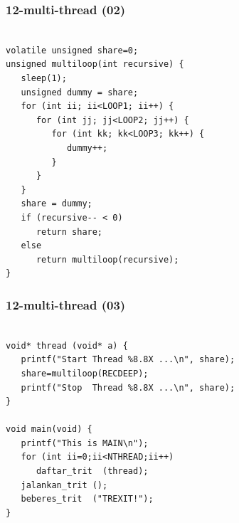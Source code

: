 \documentclass[xcolor=table, notheorems, hyperref={pdfpagelabels=false}]{beamer}
\begin{document}
\begin{frame}[fragile]
\frametitle{12-multi-thread (02)}
\begin{lstlisting}[basicstyle=\ttfamily\small]        %  65
% \begin{lstlisting}[basicstyle=\ttfamily\large]        %  54

volatile unsigned share=0;
unsigned multiloop(int recursive) {
   sleep(1);
   unsigned dummy = share;
   for (int ii; ii<LOOP1; ii++) {
      for (int jj; jj<LOOP2; jj++) {
         for (int kk; kk<LOOP3; kk++) {
            dummy++;
         }
      }
   }
   share = dummy;
   if (recursive-- < 0)
      return share;
   else
      return multiloop(recursive);
}

\end{lstlisting}
\end{frame}

\begin{frame}[fragile]
\frametitle{12-multi-thread (03)}
\begin{lstlisting}[basicstyle=\ttfamily\large]        %  54

void* thread (void* a) {
   printf("Start Thread %8.8X ...\n", share);
   share=multiloop(RECDEEP);
   printf("Stop  Thread %8.8X ...\n", share);
}

void main(void) {
   printf("This is MAIN\n");
   for (int ii=0;ii<NTHREAD;ii++)
      daftar_trit  (thread);
   jalankan_trit ();
   beberes_trit  ("TREXIT!");
}

\end{lstlisting}
\end{frame}
\end{document}
